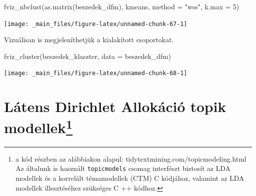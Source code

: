 \documentclass[
]{book}
\newenvironment{Shaded}{\begin{snugshade}}{\end{snugshade}}
\newcommand{\AttributeTok}[1]{\textcolor[rgb]{0.77,0.63,0.00}{#1}}
\newcommand{\DecValTok}[1]{\textcolor[rgb]{0.00,0.00,0.81}{#1}}
\newcommand{\FunctionTok}[1]{\textcolor[rgb]{0.00,0.00,0.00}{#1}}
\newcommand{\NormalTok}[1]{#1}
\newcommand{\StringTok}[1]{\textcolor[rgb]{0.31,0.60,0.02}{#1}}
\begin{document}
\begin{Shaded}
\begin{Highlighting}[]

\FunctionTok{fviz\_nbclust}\NormalTok{(}\FunctionTok{as.matrix}\NormalTok{(beszedek\_dfm), kmeans, }\AttributeTok{method =} \StringTok{"wss"}\NormalTok{, }\AttributeTok{k.max =} \DecValTok{5}\NormalTok{)}
\end{Highlighting}
\end{Shaded}

\begin{center}\texttt{[image: \_main\_files/figure-latex/unnamed-chunk-67-1]} \end{center}

Vizuálisan is megjeleníthetjük a kialakított csoportokat.

\begin{Shaded}
\begin{Highlighting}[]
\FunctionTok{fviz\_cluster}\NormalTok{(beszedek\_klaszter, }\AttributeTok{data =}\NormalTok{ beszedek\_dfm)}
\end{Highlighting}
\end{Shaded}

\begin{center}\texttt{[image: \_main\_files/figure-latex/unnamed-chunk-68-1]} \end{center}

\hypertarget{luxe1tens-dirichlet-allokuxe1ciuxf3-topik-modellekklasztering_topicmodellek-1}{%
\section[Látens Dirichlet Allokáció topik
modellek]{\texorpdfstring{Látens Dirichlet Allokáció topik
modellek\footnote{a kód részben az alábbiakon alapul:
  tidytextmining.com/topicmodeling.html Az általunk is használt
  \texttt{topicmodels} csomag interfészt biztosít az LDA modellek és a
  korrelált témamodellek (CTM) C kódjához, valamint az LDA modellek
  illesztéséhez szükséges C ++ kódhoz.}}{Látens Dirichlet Allokáció topik modellek}}\label{luxe1tens-dirichlet-allokuxe1ciuxf3-topik-modellekklasztering_topicmodellek-1}}
\end{document}
